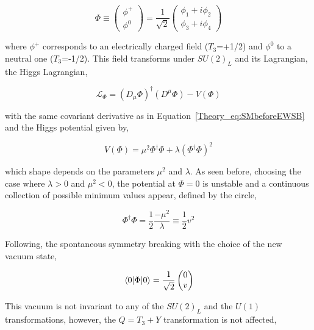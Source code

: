 \begin{equation}
    \Phi\equiv
    \begin{pmatrix} \phi^+ \\ \phi^0 \end{pmatrix}
    =\frac{1}{\sqrt{2}}
    \begin{pmatrix} \phi_1 + i\phi_2 \\ \phi_3 + i\phi_4 \end{pmatrix}
\end{equation}

where $\phi^+$ corresponds to an electrically charged field ($T_3$=+1/2) and $\phi^0$ to a neutral one ($T_3$=-1/2). This field transforms under $SU(2)_L$ and its Lagrangian, the Higgs Lagrangian,

\begin{equation}
    \mathcal{L}_\Phi = (D_\mu\Phi)^\dag(D^\mu\Phi)-V(\Phi)
\end{equation}

with the same covariant derivative as in Equation~\ref{Theory_eq:SMbeforeEWSB} and the Higgs potential given by,

\begin{equation}
    V(\Phi) = \mu^2\Phi^\dag\Phi+\lambda(\Phi^\dag\Phi)^2
\end{equation}

which shape depends on the parameters $\mu^2$ and $\lambda$. As seen before, choosing the case where $\lambda>0$ and $\mu^2<0$, the potential at $\Phi=0$ is unstable and a continuous collection of possible minimum values appear, defined by the circle,

\begin{equation}
    \Phi^\dag\Phi=\frac{1}{2}\frac{-\mu^2}{\lambda}\equiv\frac{1}{2}v^2
\end{equation}

Following, the spontaneous symmetry breaking with the choice of the new vacuum state,

\begin{equation}
    \expval{\Phi}{0} =\frac{1}{\sqrt{2}}\begin{pmatrix}
    0\\v
    \end{pmatrix}
\end{equation}

This vacuum is not invariant to any of the $SU(2)_L$ and the $U(1)$ transformations, however, the $Q=T_3+Y$ transformation is not affected,

